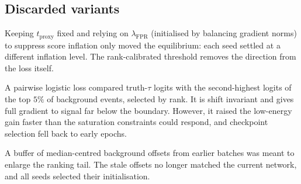 \subsection{Discarded variants}
\begin{description}[leftmargin=0pt,itemsep=2pt]
  \item[Frozen proxy threshold with a counterweight.] Keeping $t_{\mathrm{proxy}}$ fixed and relying on $\lambda_{\mathrm{FPR}}$ (initialised by balancing gradient norms) to suppress score inflation only moved the equilibrium: each seed settled at a different inflation level. The rank-calibrated threshold removes the direction from the loss itself.
  \item[Tail-ranking objective.] A pairwise logistic loss compared truth-$\tau$ logits with the second-highest logits of the top $5\%$ of background events, selected by rank. It is shift invariant and gives full gradient to signal far below the boundary. However, it raised the low-energy gain faster than the saturation constraints could respond, and checkpoint selection fell back to early epochs.
  \item[Hard-negative memory bank.] A buffer of median-centred background offsets from earlier batches was meant to enlarge the ranking tail. The stale offsets no longer matched the current network, and all seeds selected their initialisation.
\end{description}

